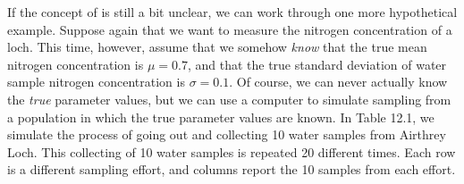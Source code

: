 \documentclass[
  openany]{krantz}
\begin{document}
If the concept of  is still a bit unclear, we can work through one more hypothetical example.
Suppose again that we want to measure the nitrogen concentration of a loch.
This time, however, assume that we somehow \emph{know} that the true mean nitrogen concentration is \(\mu = 0.7\), and that the true standard deviation of water sample nitrogen concentration is \(\sigma = 0.1\).
Of course, we can never actually know the \emph{true} parameter values, but we can use a computer to simulate sampling from a population in which the true parameter values are known.
In Table 12.1, we simulate the process of going out and collecting 10 water samples from Airthrey Loch.
This collecting of 10 water samples is repeated 20 different times.
Each row is a different sampling effort, and columns report the 10 samples from each effort.

\newpage
\end{document}

